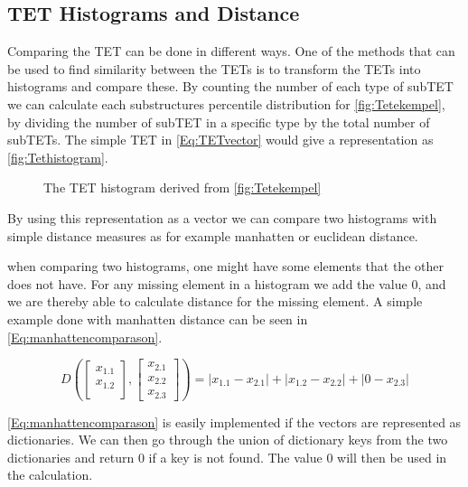 \subsection{TET Histograms and Distance}
	Comparing the TET can be done in different ways. One of the methods that can be used to find similarity between the TETs is to transform the TETs into histograms and compare these\cite{JAEGER201330}. By counting the number of each type of subTET we can calculate each substructures percentile distribution for \autoref{fig:Tetekempel}, by dividing the number of subTET in a specific type by the total number of subTETs. The simple TET in \autoref{Eq:TETvector} would give a representation as \autoref{fig:Tethistogram}.
	
	\begin{figure}[H]
		\centering
		\begin{adjustbox}{width=0.5\textwidth}
			
		\end{adjustbox}
		\caption{The TET histogram derived from \autoref{fig:Tetekempel}}
		\label{fig:Tethistogram}
	\end{figure}
	
	By using this representation as a vector we can compare two histograms with simple distance measures as for example manhatten or euclidean distance.
	
	when comparing two histograms, one might have some elements that the other does not have. For any missing element in a histogram we add the value $0$, and we are thereby able to calculate distance for the missing element. A simple example done with manhatten distance can be seen in \autoref{Eq:manhattencomparason}\cite{singh2013k}.
	
	\begin{equation}\label{Eq:manhattencomparason}
	D(\begin{bmatrix}
	x_{1.1} \\
	x_{1.2} \\
	\end{bmatrix},
	\begin{bmatrix}
	x_{2.1} \\
	x_{2.2} \\
	x_{2.3}
	\end{bmatrix})= |x_{1.1} - x_{2.1}| + |x_{1.2} - x_{2.2}| + |0 - x_{2.3}|
	\end{equation}
	
	\autoref{Eq:manhattencomparason} is easily implemented if the vectors are represented as dictionaries. We can then go through the union of dictionary keys from the two dictionaries and return $0$ if a key is not found. The value $0$ will then be used in the calculation. 
